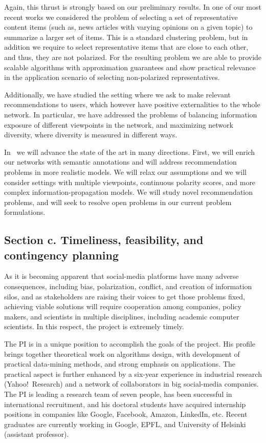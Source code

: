 \documentclass[a4paper,11pt]{article}
\begin{document}
\medskip
Again, this thrust is strongly based on our preliminary results.
In one of our most recent works we considered the problem of 
selecting a set of representative content items
(such as, news articles with varying opinions on a given topic)
to summarize a larger set of items. %
This is a standard clustering problem, 
but in addition we require to select representative items
that are close to each other,
and thus, they are not polarized.
For the resulting problem we are able to provide scalable
algorithms with approximation guarantees
and show practical relevance in the application scenario
of selecting non-polarized representatives.

\smallskip
Additionally, we have studied the setting where
we ask to make relevant recommendations to users, 
which however have positive externalities to the whole network.
In particular,
we have addressed the problems
of balancing information exposure of different viewpoints in the network,
and maximizing network diversity, 
where diversity is measured in different ways.

\smallskip
In \acronym\ we will advance the state of the art in many directions.
First, we will enrich our networks with semantic annotations 
and will address recommendation problems in more realistic models. 
We will relax our assumptions and we will consider settings with multiple viewpoints, 
continuous polarity scores, 
and more complex information-propagation models.
We will study novel recommendation problems, 
and will seek to resolve open problems in our current problem formulations.

\subsection*{Section c. Timeliness, feasibility, and contingency planning}

As it is becoming apparent that social-media platforms have many adverse consequences,
including bias, polarization, conflict, and creation of information silos, 
and as stakeholders are raising their voices to get those problems fixed, 
achieving viable solutions will require cooperation among companies, policy makers, 
and scientists in multiple disciplines, including academic computer scientists. 
In this respect, the project is extremely timely.

\smallskip 
The PI is in a unique position to accomplish the goals of the project. 
His profile brings together 
the\-o\-ret\-i\-cal work on algorithms design,
with development of practical data-mining methods, 
and strong emphasis on applications.
The practical aspect is further enhanced by a six-year experience in industrial research 
(Yahoo!\ Research)
and a network of collaborators in big social-media companies.
The PI is leading a research team of seven people, 
has been successful in international recruitment, 
and his doctoral students have acquired internship positions in companies
like Google, Facebook, Amazon, LinkedIn, etc.
Recent graduates are currently working in Google, EPFL, 
and University of Helsinki (assistant professor).
\end{document}
